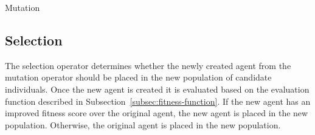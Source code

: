 \begin{algorithm}
	\caption{Mutation}
	\label{alg:de-mutation}
	\begin{algorithmic}

				\ELSE
				\ENDIF
			\ENDFOR
			\ENDIF
		\ENDFOR

	\end{algorithmic}
\end{algorithm}

\subsection{Selection}
\label{subsec:de-selection}

The selection operator determines whether the newly created agent from the mutation operator should be placed in the new population of candidate individuals. Once the new agent is created it is evaluated based on the evaluation function described in Subsection~\ref{subsec:fitness-function}. If the new agent has an improved fitness score over the original agent, the new agent is placed in the new population. Otherwise, the original agent is placed in the new population.
